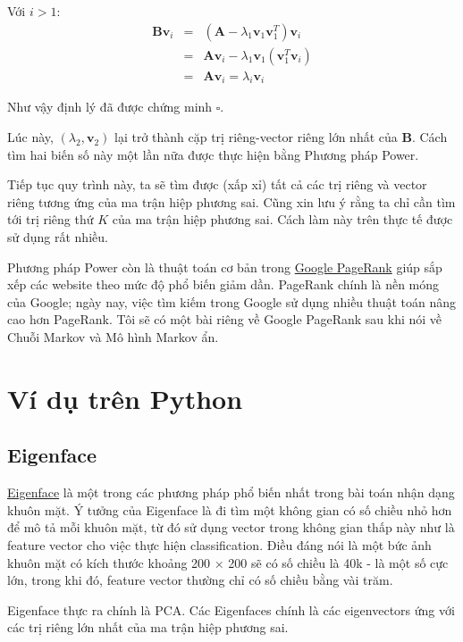 Với $i > 1$: 
\begin{eqnarray} 
  \mathbf{Bv}_i &=& (\mathbf{A} - \lambda_1 \mathbf{v}_1 \mathbf{v}_1^T)\mathbf{v}_i \\\ 
  &=& \mathbf{Av}_i - \lambda_1 \mathbf{v}_1 (\mathbf{v}_1^T \mathbf{v}_i) \\\ 
  &=& \mathbf{Av}_i = \lambda_i \mathbf{v}_i 
\end{eqnarray} 
 
Như vậy định lý đã được chứng minh $\square$. 
 
Lúc này, $(\lambda_2, \mathbf{v}_2)$ lại trở thành cặp trị riêng-vector riêng lớn nhất của $\mathbf{B}$. Cách tìm hai biến số này một lần nữa được thực hiện bằng Phương pháp Power. 
 
Tiếp tục quy trình này, ta sẽ tìm được (xấp xỉ) tất cả các trị riêng và vector riêng tương ứng của ma trận hiệp phương sai. Cũng xin lưu ý rằng ta chỉ cần tìm tới trị riêng thứ $K$ của ma trận hiệp phương sai. Cách làm này trên thực tế được sử dụng rất nhiều. 
 
Phương pháp Power còn là thuật toán cơ bản trong \href{https://en.wikipedia.org/wiki/PageRank}{Google PageRank} giúp sắp xếp các website theo mức độ phổ biến giảm dần. PageRank chính là nền móng của Google; ngày nay, việc tìm kiếm trong Google sử dụng nhiều thuật toán nâng cao hơn PageRank. Tôi sẽ có một bài riêng về Google PageRank sau khi nói về Chuỗi Markov và Mô hình Markov ẩn. 
 
 
\section{Ví dụ trên Python}
 
 
\subsection{Eigenface}
\href{https://en.wikipedia.org/wiki/Eigenface}{Eigenface} là một trong các phương pháp phổ biến nhất trong bài toán nhận dạng khuôn mặt. Ý tưởng của Eigenface là đi tìm một không gian có số chiều nhỏ hơn để mô tả mỗi khuôn mặt, từ đó sử dụng vector trong không gian thấp này như là feature vector cho việc thực hiện classification. Điều đáng nói là một bức ảnh khuôn mặt có kích thước khoảng 200 $\times$ 200 sẽ có số chiều là 40k - là một số cực lớn, trong khi đó, feature vector thường chỉ có số chiều bằng vài trăm. 
 
Eigenface thực ra chính là PCA. Các Eigenfaces chính là các eigenvectors ứng với các trị riêng lớn nhất của ma trận hiệp phương sai. 
 
